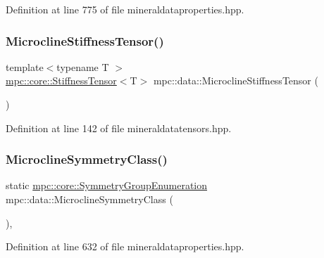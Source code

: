Definition at line 775 of file mineraldataproperties.\+hpp.

\mbox{\label{namespacempc_1_1data_ac532f7ca3b056afbd470d469e730568a}} 
\subsubsection{\texorpdfstring{Microcline\+Stiffness\+Tensor()}{MicroclineStiffnessTensor()}}
{\footnotesize\ttfamily template$<$typename T $>$ \\
\mbox{\hyperlink{structmpc_1_1core_1_1_stiffness_tensor}{mpc\+::core\+::\+Stiffness\+Tensor}}$<$T$>$ mpc\+::data\+::\+Microcline\+Stiffness\+Tensor (\begin{DoxyParamCaption}{ }\end{DoxyParamCaption})}



Definition at line 142 of file mineraldatatensors.\+hpp.

\mbox{\label{namespacempc_1_1data_aa51ae2cf0152d92fe3869d413d84a51f}} 
\subsubsection{\texorpdfstring{Microcline\+Symmetry\+Class()}{MicroclineSymmetryClass()}}
{\footnotesize\ttfamily static \mbox{\hyperlink{namespacempc_1_1core_a9d979684062547055a0ef5c13077bad8}{mpc\+::core\+::\+Symmetry\+Group\+Enumeration}} mpc\+::data\+::\+Microcline\+Symmetry\+Class (\begin{DoxyParamCaption}{ }\end{DoxyParamCaption})\hspace{0.3cm}{\ttfamily [inline]}, {\ttfamily [static]}}



Definition at line 632 of file mineraldataproperties.\+hpp.

\mbox{\label{namespacempc_1_1data_a3a5ad6b593ca8b12aa64bb13f8fac8f2}} 
